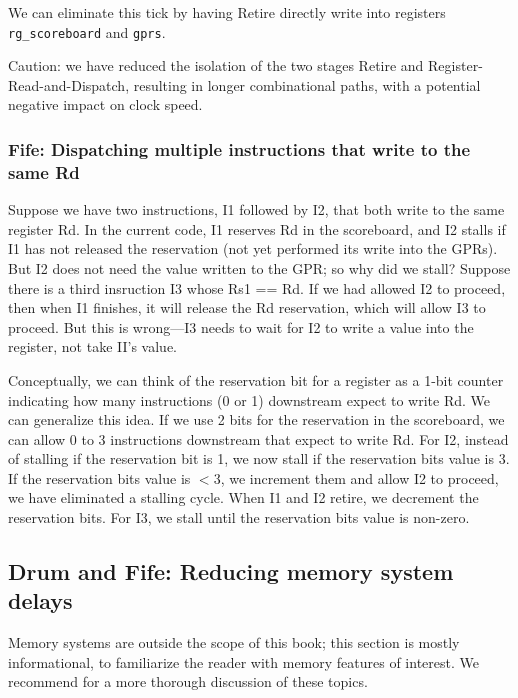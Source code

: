 We can eliminate this tick by having Retire directly write into
registers \verb|rg_scoreboard| and \verb|gprs|.

Caution: we have reduced the isolation of the two stages Retire and
Register-Read-and-Dispatch, resulting in longer combinational paths,
with a potential negative impact on clock speed.


\subsubsection{Fife: Dispatching multiple instructions that write to the same Rd}

Suppose we have two instructions, I1 followed by I2, that both write
to the same register Rd.  In the current code, I1 reserves Rd in the
scoreboard, and I2 stalls if I1 has not released the reservation (not
yet performed its write into the GPRs).  But I2 does not need the
value written to the GPR; so why did we stall?  Suppose there is a
third insruction I3 whose Rs1 == Rd.  If we had allowed I2 to proceed,
then when I1 finishes, it will release the Rd reservation, which will
allow I3 to proceed.  But this is wrong---I3 needs to wait for I2 to
write a value into the register, not take II's value.

Conceptually, we can think of the reservation bit for a register as a
1-bit counter indicating how many instructions (0 or 1) downstream
expect to write Rd.  We can generalize this idea. If we use 2 bits for
the reservation in the scoreboard, we can allow 0 to 3 instructions
downstream that expect to write Rd.  For I2, instead of stalling if
the reservation bit is 1, we now stall if the reservation bits value
is 3.  If the reservation bits value is $< 3$, we increment them and
allow I2 to proceed, {\ie} we have eliminated a stalling cycle.  When
I1 and I2 retire, we decrement the reservation bits.  For I3, we stall
until the reservation bits value is non-zero.


\subsection{Drum and Fife: Reducing memory system delays}

Memory systems are outside the scope of this book; this section is
mostly informational, to familiarize the reader with memory features
of interest.  We recommend \cite{Hennessy2017} for a more thorough
discussion of these topics.

